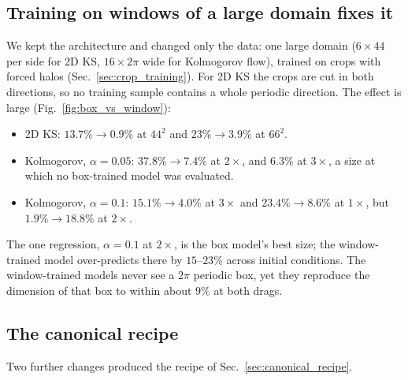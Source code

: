 \subsection{Training on windows of a large domain fixes it}
\label{sec:window_fix}

We kept the architecture and changed only the data: one large domain
($6\times44$ per side for 2D KS, $16\times2\pi$ wide for Kolmogorov
flow), trained on crops with forced halos (Sec.~\ref{sec:crop_training}).
For 2D KS the crops are cut in both directions, so no training sample
contains a whole periodic direction. The effect is large
(Fig.~\ref{fig:box_vs_window}):
\begin{itemize}
\item 2D KS: $13.7\%\to0.9\%$ at $44^2$ and $23\%\to3.9\%$ at $66^2$.
\item Kolmogorov, $\alpha=0.05$: $37.8\%\to7.4\%$ at $2\times$, and $6.3\%$ at
  $3\times$, a size at which no box-trained model was evaluated.
\item Kolmogorov, $\alpha=0.1$: $15.1\%\to4.0\%$ at $3\times$ and
  $23.4\%\to8.6\%$ at $1\times$, but $1.9\%\to18.8\%$ at $2\times$.
\end{itemize}
The one regression, $\alpha=0.1$ at $2\times$, is the box model's
best size; the window-trained model over-predicts there by $15$--$23\%$
across initial conditions. The window-trained models never see a $2\pi$
periodic box, yet they reproduce the dimension of that box to within
about $9\%$ at both drags.

\subsection{The canonical recipe}
\label{sec:canonical_results}

Two further changes produced the recipe of Sec.~\ref{sec:canonical_recipe}.

